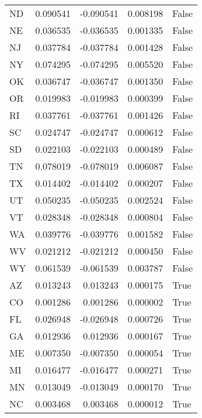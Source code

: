 \begin{table}
\begin{tabular}{lrrrl}
      ND &   0.090541 & -0.090541 &       0.008198 &         False \\
      NE &   0.036535 & -0.036535 &       0.001335 &         False \\
      NJ &   0.037784 & -0.037784 &       0.001428 &         False \\
      NY &   0.074295 & -0.074295 &       0.005520 &         False \\
      OK &   0.036747 & -0.036747 &       0.001350 &         False \\
      OR &   0.019983 & -0.019983 &       0.000399 &         False \\
      RI &   0.037761 & -0.037761 &       0.001426 &         False \\
      SC &   0.024747 & -0.024747 &       0.000612 &         False \\
      SD &   0.022103 & -0.022103 &       0.000489 &         False \\
      TN &   0.078019 & -0.078019 &       0.006087 &         False \\
      TX &   0.014402 & -0.014402 &       0.000207 &         False \\
      UT &   0.050235 & -0.050235 &       0.002524 &         False \\
      VT &   0.028348 & -0.028348 &       0.000804 &         False \\
      WA &   0.039776 & -0.039776 &       0.001582 &         False \\
      WV &   0.021212 & -0.021212 &       0.000450 &         False \\
      WY &   0.061539 & -0.061539 &       0.003787 &         False \\
      AZ &   0.013243 &  0.013243 &       0.000175 &          True \\
      CO &   0.001286 &  0.001286 &       0.000002 &          True \\
      FL &   0.026948 & -0.026948 &       0.000726 &          True \\
      GA &   0.012936 &  0.012936 &       0.000167 &          True \\
      ME &   0.007350 & -0.007350 &       0.000054 &          True \\
      MI &   0.016477 & -0.016477 &       0.000271 &          True \\
      MN &   0.013049 & -0.013049 &       0.000170 &          True \\
      NC &   0.003468 &  0.003468 &       0.000012 &          True \\

\end{tabular}
\end{table}
